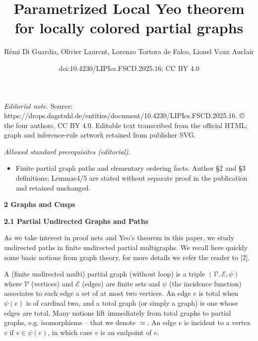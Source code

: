 \documentclass[10pt,a4paper]{amsart}
\title{Parametrized Local Yeo theorem for locally colored partial graphs}
\author{Rémi Di Guardia, Olivier Laurent, Lorenzo Tortora de Falco, Lionel Vaux Auclair}
\date{doi:10.4230/LIPIcs.FSCD.2025.16; CC BY 4.0}
\begin{document}
\maketitle
\noindent\textit{Editorial note.} Source: https://drops.dagstuhl.de/entities/document/10.4230/LIPIcs.FSCD.2025.16. © the four authors, CC BY 4.0. Editable text transcribed from the official HTML; graph and inference-rule artwork retained from publisher SVG.\par\medskip
\noindent\textit{Allowed standard prerequisites (editorial).}\begin{itemize}
\item Finite partial graph paths and elementary ordering facts. Author §2 and §3 definitions; Lemmas4/5 are stated without separate proof in the publication and retained unchanged.
\end{itemize}\medskip
 
\par\medskip\noindent\textbf{2 Graphs and Cusps}\par
 
 
\par\medskip\noindent\textbf{2.1 Partial Undirected Graphs and Paths}\par
 
 
As we take interest in proof nets and Yeo’s theorem in this paper, we study undirected paths in finite undirected partial multigraphs. We recall here quickly some basic notions from graph theory, for more details we refer the reader to [2].\par
 
 
 
A (finite undirected multi) partial graph (without loop) is a triple $(\mathcal{V},\mathcal{E},\psi)$ where $\mathcal{V}$ (vertices) and $\mathcal{E}$ (edges) are finite sets and $\psi$ (the incidence function) associates to each edge a set of at most two vertices. An edge $e$ is total when $\psi(e)$ is of cardinal two, and a total graph (or simply a graph) is one whose edges are total. Many notions lift immediately from total graphs to partial graphs, e.g. isomorphisms – that we denote $\simeq$. An edge $e$ is incident to a vertex $v$ if $v\in\psi(e)$, in which case $v$ is an endpoint of $e$.\par
 
 
\end{document}
